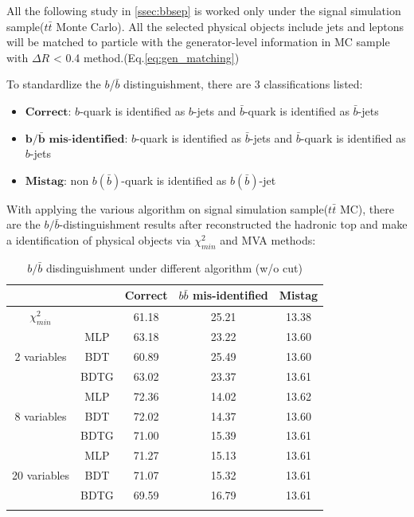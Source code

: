 		All the following study in \ref{ssec:bbsep} is worked only under the signal simulation sample($t$$\bar{t}$ Monte Carlo). All the selected physical objects include jets and leptons will be matched to particle with the generator-level information in MC sample with $\Delta R$ < 0.4 method.(Eq.\ref{eq:gen_matching})

		To standardlize the $b$/$\bar{b}$ distinguishment, there are 3 classifications listed:
		\begin{itemize}
  		\item $\textbf{Correct}$: $b$-quark is identified as $b$-jets and $\bar{b}$-quark is identified as $\bar{b}$-jets
  		\item $\textbf{b/}$$\bar{\textbf{b}}$ $\textbf{mis-identified}$: $b$-quark is identified as $\bar{b}$-jets and $\bar{b}$-quark is identified as $b$-jets
  		\item $\textbf{Mistag}$: non $b$$(\bar{b})$-quark is identified as $b$$(\bar{b})$-jet
		\end{itemize}

		With applying the various algorithm on signal simulation sample($t\bar{t}$ MC), there are the $b/\bar{b}$-distinguishment results after reconstructed the hadronic top and make a identification of physical objects via $\chi^2_{min}$ and MVA methods:

		\begin{center}
		\begin{longtable}[H]{ c c | c c c }			%
		\caption{$b/\bar{b}$ disdinguishment under different algorithm (w/o cut)}\\
		\hline
		[\%] & & Correct & $b\bar{b}$ mis-identified & Mistag  \\ 
		\hline
		$\chi^2_{min}$ &  &    61.18 & 25.21 & 13.38 \\
		\hline
		\multirow{3}{5em}{2 variables} & MLP & 63.18 & 23.22 & 13.60 \\
		& BDT & 60.89 & 25.49 & 13.60 \\
		& BDTG & 63.02 & 23.37 & 13.61 \\
		\hline
		\multirow{3}{5em}{8 variables} & MLP & 72.36 & 14.02 & 13.62 \\
		& BDT & 72.02 & 14.37 & 13.60 \\
		& BDTG & 71.00 & 15.39 & 13.61 \\
		\hline
		\multirow{3}{5em}{20 variables} & MLP & 71.27 & 15.13 & 13.61 \\
		& BDT & 71.07 & 15.32 & 13.61 \\
		& BDTG & 69.59 & 16.79 & 13.61 \\
		\hline
		\label{EventSelReco:tb:nocut_bbsep}
		\end{longtable}
		\end{center}

